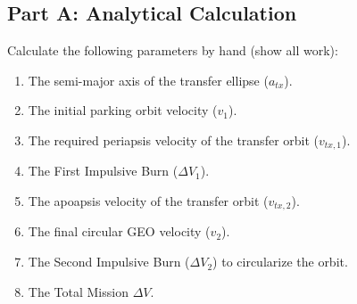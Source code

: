 \documentclass[11pt, letterpaper]{article}
\begin{document}
\subsection*{Part A: Analytical Calculation}
Calculate the following parameters by hand (show all work):
\begin{enumerate}
    \item The semi-major axis of the transfer ellipse ($a_{tx}$).
    \item The initial parking orbit velocity ($v_1$).
    \item The required periapsis velocity of the transfer orbit ($v_{tx,1}$).
    \item The First Impulsive Burn ($\Delta V_1$).
    \item The apoapsis velocity of the transfer orbit ($v_{tx,2}$).
    \item The final circular GEO velocity ($v_2$).
    \item The Second Impulsive Burn ($\Delta V_2$) to circularize the orbit.
    \item The Total Mission $\Delta V$.
\end{enumerate}
\end{document}
